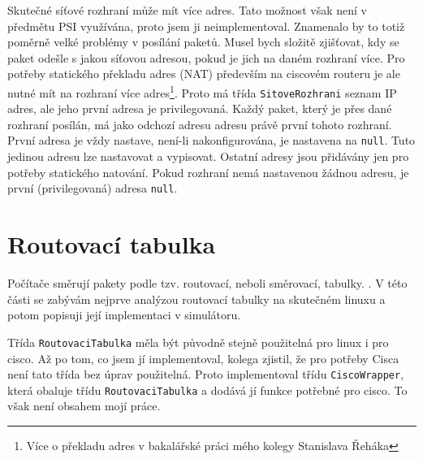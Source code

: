 Skutečné síťové rozhraní může mít více adres. Tato možnost však není v předmětu PSI využívána, proto jsem ji neimplementoval. Znamenalo by to totiž poměrně velké problémy v posílání paketů. Musel bych složitě zjišťovat, kdy se paket odešle s jakou síťovou adresou, pokud je jich na daném rozhraní více. Pro potřeby statického překladu adres (NAT) především na ciscovém routeru je ale nutné mít na rozhraní více adres\footnote{Více o překladu adres v bakalářské práci mého kolegy Stanislava Řeháka}. Proto má třída \verb|SitoveRozhrani| seznam IP adres, ale jeho první adresa je privilegovaná. Každý paket, který je přes dané rozhraní posílán, má jako odchozí adresu adresu právě první tohoto rozhraní. První adresa je vždy nastave, není-li nakonfigurována, je nastavena na \verb|null|. Tuto jedinou adresu lze nastavovat a vypisovat. Ostatní adresy jsou přidávány jen pro potřeby statického natování. Pokud rozhraní nemá nastavenou žádnou adresu, je první (privilegovaná) adresa \verb|null|.




\section{Routovací tabulka}


Počítače směrují pakety podle tzv. routovací, neboli směrovací, tabulky. \cite{owebu:routovaci_tabulka}. V této části se zabývám nejprve analýzou routovací tabulky na skutečném linuxu a potom popisuji její implementaci v simulátoru.

Třída \verb|RoutovaciTabulka| měla být původně stejně použitelná pro linux i pro cisco. Až po tom, co jsem jí implementoval, kolega zjistil, že pro potřeby Cisca není tato třída bez úprav použitelná. Proto implementoval třídu \verb|CiscoWrapper|, která obaluje třídu \verb|RoutovaciTabulka| a dodává jí funkce potřebné pro cisco. To však není obsahem mojí práce.


